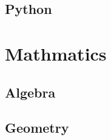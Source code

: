 \documentclass[letterpaper,10pt,english]{sphinxmanual}
\begin{document}
\section{Python}
\label{language/python:python}\label{language/python::doc}

\chapter{Mathmatics}
\label{index:mathmatics}

\section{Algebra}
\label{math/algebra::doc}\label{math/algebra:algebra}

\section{Geometry}
\label{math/geometry:geometry}\label{math/geometry::doc}


\renewcommand{\indexname}{Index}
\printindex
\end{document}
